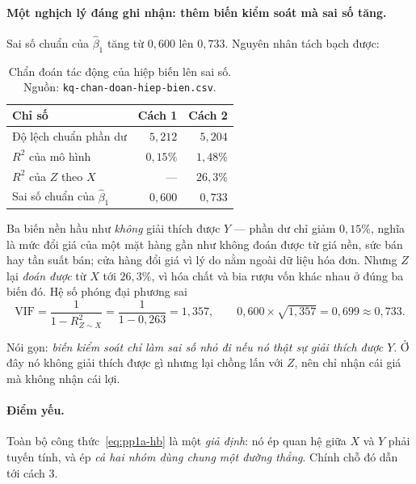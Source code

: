 \documentclass[11pt]{article}
\begin{document}
\paragraph{Một nghịch lý đáng ghi nhận: thêm biến kiểm soát mà sai số tăng.} Sai số chuẩn của
$\hat\beta_1$ tăng từ $0{,}600$ lên $0{,}733$. Nguyên nhân tách bạch được:

\begin{table}[htbp]
  \centering
  \caption{Chẩn đoán tác động của hiệp biến lên sai số. Nguồn:
  \texttt{kq-chan-doan-hiep-bien.csv}.}
  \label{tab:chan-doan-hb}
  \begin{tabular}{lrr}
    \toprule
    Chỉ số & Cách 1 & Cách 2 \\
    \midrule
    Độ lệch chuẩn phần dư          & $5{,}212$ & $5{,}204$ \\
    $R^2$ của mô hình              & $0{,}15\%$ & $1{,}48\%$ \\
    $R^2$ của $Z$ theo $X$         & ---        & $26{,}3\%$ \\
    Sai số chuẩn của $\hat\beta_1$ & $0{,}600$ & $0{,}733$ \\
    \bottomrule
  \end{tabular}
\end{table}

Ba biến nền hầu như \emph{không} giải thích được $Y$ --- phần dư chỉ giảm $0{,}15\%$, nghĩa là mức
đổi giá của một mặt hàng gần như không đoán được từ giá nền, sức bán hay tần suất bán; cửa hàng đổi
giá vì lý do nằm ngoài dữ liệu hóa đơn. Nhưng $Z$ lại \emph{đoán được} từ $X$ tới $26{,}3\%$, vì
hóa chất và bia rượu vốn khác nhau ở đúng ba biến đó. Hệ số phóng đại phương sai
\begin{equation}
  \mathrm{VIF} = \frac{1}{1 - R^2_{Z \sim X}} = \frac{1}{1 - 0{,}263} = 1{,}357,
  \qquad
  0{,}600 \times \sqrt{1{,}357} = 0{,}699 \approx 0{,}733.
  \label{eq:vif}
\end{equation}

Nói gọn: \emph{biến kiểm soát chỉ làm sai số nhỏ đi nếu nó thật sự giải thích được $Y$}. Ở đây nó
không giải thích được gì nhưng lại chồng lấn với $Z$, nên chỉ nhận cái giá mà không nhận cái lợi.

\paragraph{Điểm yếu.} Toàn bộ công thức~\eqref{eq:pp1a-hb} là một \emph{giả định}: nó ép quan hệ
giữa $X$ và $Y$ phải tuyến tính, và ép \emph{cả hai nhóm dùng chung một đường thẳng}. Chính chỗ đó
dẫn tới cách 3.
\end{document}

